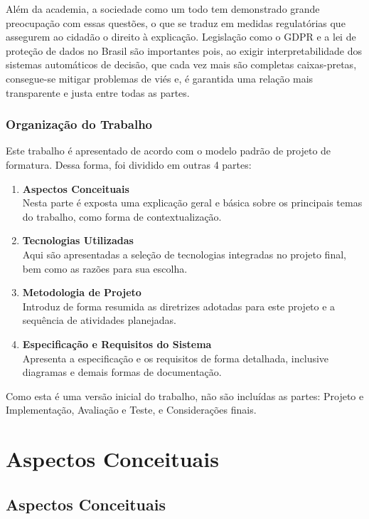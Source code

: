 \documentclass[]{politex}
\begin{document}
Além da academia, a sociedade como um todo tem demonstrado grande preocupação com essas questões, o que se traduz em medidas regulatórias que assegurem ao cidadão o direito à explicação. Legislação como o GDPR \cite{eu-269-2014} e a lei de proteção de dados no Brasil são importantes pois, ao exigir interpretabilidade dos sistemas automáticos de decisão, que cada vez mais são completas caixas-pretas, consegue-se mitigar problemas de viés e, é garantida uma relação mais transparente e justa entre todas as partes. 

\section{Organização do Trabalho}

Este trabalho é apresentado de acordo com o modelo padrão de projeto de formatura. Dessa forma, foi dividido em outras 4 partes:

\begin{enumerate}
    \item \textbf{Aspectos Conceituais} \\
    Nesta parte é exposta uma explicação geral e básica sobre os principais temas do trabalho, como forma de contextualização. 
    \item \textbf{Tecnologias Utilizadas} \\
    Aqui são apresentadas a seleção de tecnologias integradas no projeto final, bem como as razões para sua escolha.
    \item \textbf{Metodologia de Projeto} \\
    Introduz de forma resumida as diretrizes adotadas para este projeto e a sequência de atividades planejadas.
    \item \textbf{Especificação e Requisitos do Sistema} \\
    Apresenta a especificação e os requisitos de forma detalhada, inclusive diagramas e demais formas de documentação.
\end{enumerate}

Como esta é uma versão inicial do trabalho, não são incluídas as partes: Projeto e Implementação, Avaliação e Teste, e Considerações finais. 

\part{Aspectos Conceituais}

\chapter{Aspectos Conceituais}
\end{document}
